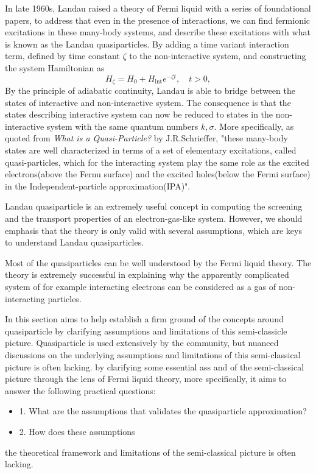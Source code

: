 In late 1960s, Landau raised a theory of Fermi liquid with a series of foundational papers\cite{Landau1956}\cite{Landau1957}, to address that even in the presence of interactions, we can find fermionic excitations in these many-body systems, and describe these excitations with what is known as the Landau quasiparticles. By adding a time variant interaction term, defined by time constant $\zeta$ to the non-interactive system, and constructing the system Hamiltonian as
\[
H_{\zeta} = H_0 + H_{\text{int}} e^{-\zeta t}, \quad t > 0,
\]
By the principle of adiabatic continuity, Landau is able to bridge between the states of interactive and non-interactive system. The consequence is that the states describing interactive system can now be reduced to states in the non-interactive system with the same quantum numbers $k, \sigma$. More specifically, as quoted from \textit{What is a Quasi-Particle?} by J.R.Schrieffer, "these many-body states are well characterized in terms of a set of elementary excitations, called quasi-particles, which for the interacting system play the same role as the excited electrons(above the Fernu surface) and the excited holes(below the Fermi surface) in the Independent-particle approximation(IPA)". 

Landau quasiparticle is an extremely useful concept in computing the screening and the transport properties of an electron-gas-like system. However, we should emphasis that the theory is only valid with several assumptions, which are keys to understand Landau quasiparticles. 





Most of the quasiparticles can be well understood by the Fermi liquid theory. The theory is extremely successful in explaining why the apparently complicated system of for example interacting electrons can be considered as a gas of non-interacting particles. 

In this section aims to help establish a firm ground of the concepts around quasiparticle by clarifying assumptions and limitations of this semi-classicle picture. 
Quasiparticle is used extensively by the community, but nuanced discussions on the underlying assumptions and limitations of this semi-classical picture is often lacking.  by clarifying some essential ass
 and of the semi-classical picture through the lens of Fermi liquid theory, more specifically, it aims to answer the following practical questions:

\begin{itemize}
	\item 1. What are the assumptions that validates the quasiparticle approximation? 
	\item 2. How does these assumptions 
\end{itemize}
the theoretical framework and limitations of the semi-classical picture is often lacking. 
  

